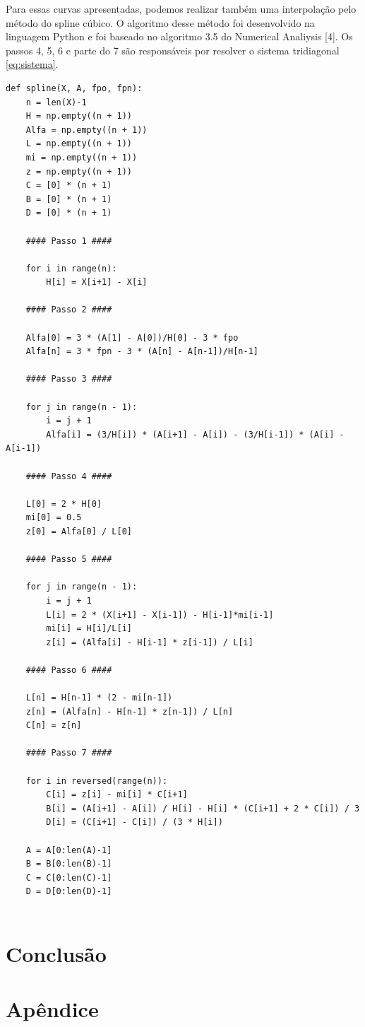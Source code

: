 \documentclass[a4paper,10pt]{article}
\begin{document}
  Para essas curvas apresentadas, podemos realizar também uma interpolação pelo método do spline cúbico.
  O algoritmo desse método foi desenvolvido na linguagem Python e foi baseado no algoritmo 3.5 do Numerical Analiysis [4]. 
  Os passos 4, 5, 6 e parte do 7 são responsáveis por resolver o sistema tridiagonal \ref{eq:sistema}.
  \begin{lstlisting}[frame=single]
   def spline(X, A, fpo, fpn):
	n = len(X)-1
	H = np.empty((n + 1))
	Alfa = np.empty((n + 1))
	L = np.empty((n + 1))
	mi = np.empty((n + 1))
	z = np.empty((n + 1))
	C = [0] * (n + 1)
	B = [0] * (n + 1)
	D = [0] * (n + 1)
	
	#### Passo 1 ####

	for i in range(n):
		H[i] = X[i+1] - X[i]
		
	#### Passo 2 ####
		
	Alfa[0] = 3 * (A[1] - A[0])/H[0] - 3 * fpo
	Alfa[n] = 3 * fpn - 3 * (A[n] - A[n-1])/H[n-1]
	
	#### Passo 3 ####

	for j in range(n - 1):
		i = j + 1
		Alfa[i] = (3/H[i]) * (A[i+1] - A[i]) - (3/H[i-1]) * (A[i] - A[i-1])
		
	#### Passo 4 ####
	
	L[0] = 2 * H[0]
	mi[0] = 0.5
	z[0] = Alfa[0] / L[0]

	#### Passo 5 ####
	
	for j in range(n - 1):
		i = j + 1
		L[i] = 2 * (X[i+1] - X[i-1]) - H[i-1]*mi[i-1]
		mi[i] = H[i]/L[i]
		z[i] = (Alfa[i] - H[i-1] * z[i-1]) / L[i]

	#### Passo 6 ####	
	
	L[n] = H[n-1] * (2 - mi[n-1])
	z[n] = (Alfa[n] - H[n-1] * z[n-1]) / L[n]
	C[n] = z[n]
	
	#### Passo 7 ####

	for i in reversed(range(n)):
		C[i] = z[i] - mi[i] * C[i+1]
		B[i] = (A[i+1] - A[i]) / H[i] - H[i] * (C[i+1] + 2 * C[i]) / 3
		D[i] = (C[i+1] - C[i]) / (3 * H[i])

	A = A[0:len(A)-1]
	B = B[0:len(B)-1]
	C = C[0:len(C)-1]
	D = D[0:len(D)-1]
	
  \end{lstlisting}

  \section{Conclusão}
  
  
  \section{Apêndice}
\end{document}

